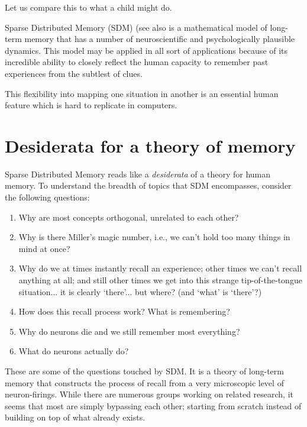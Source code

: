 Let us compare this to what a child might do.

Sparse Distributed Memory (SDM) \citep{Kanerva1988} (see also \citep{kanerva_sparse_1993, denning_sparse_1989} is a mathematical model of long-term memory that has a number of neuroscientific and psychologically plausible dynamics. This model may be applied in all sort of applications because of its incredible ability to closely reflect the human capacity to remember past experiences from the subtlest of clues.

This flexibility into mapping one situation in another is an essential human feature which is hard to replicate in computers.

\section{Desiderata for a theory of memory}


Sparse Distributed Memory reads like a \emph{desiderata} of a theory for human memory.  To understand the breadth of topics that SDM encompasses, consider the following questions:
\begin{enumerate}
    \item Why are most concepts orthogonal, unrelated to each other?
    \item Why is there Miller's magic number, i.e., we can't hold too many things in mind at once?
    \item Why do we at times instantly recall an experience; other times we can't recall anything at all; and still other times we get into this strange tip-of-the-tongue situation... it is clearly `there'... but where?  (and `what' is `there'?)
    \item How does this recall process work?  What is remembering?
    \item Why do neurons die and we still remember most everything?
    \item What do neurons actually do?
\end{enumerate}

These are some of the questions touched by SDM.  It is a theory of long-term memory that constructs the process of recall from a very microscopic level of neuron-firings. While there are numerous groups working on related research, it seems that most are simply bypassing each other; starting from scratch instead of building on top of what already exists.


